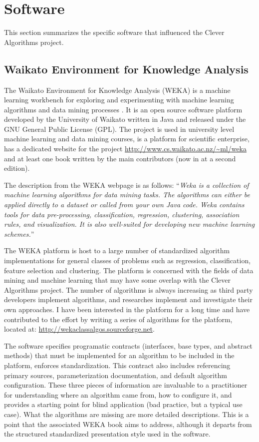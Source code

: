 \documentclass[a4paper, 11pt]{article}
\begin{document}
% 
% 
\section{Software}
\label{sec:software}
This section summarizes the specific software that influenced the Clever Algorithms project.

% 
% 
\subsection{Waikato Environment for Knowledge Analysis}
The Waikato Environment for Knowledge Analysis (WEKA) is a machine learning workbench for exploring and experimenting with machine learning algorithms and data mining processes \cite{Hall2009}. It is an open source software platform developed by the University of Waikato written in Java and released under the GNU General Public License (GPL). The project is used in university level machine learning and data mining courses, is a platform for scientific enterprise, has a dedicated website for the project \url{http://www.cs.waikato.ac.nz/~ml/weka} and at least one book written by the main contributors \cite{Witten2000} (now in at a second edition).

The description from the WEKA webpage is as follows: ``\emph{Weka is a collection of machine learning algorithms for data mining tasks. The algorithms can either be applied directly to a dataset or called from your own Java code. Weka contains tools for data pre-processing, classification, regression, clustering, association rules, and visualization. It is also well-suited for developing new machine learning schemes.}''

The WEKA platform is host to a large number of standardized algorithm implementations for general classes of problems such as regression, classification, feature selection and clustering. The platform is concerned with the fields of data mining and machine learning that may have some overlap with the Clever Algorithms project. The number of algorithms is always increasing as third party developers implement algorithms, and researches implement and investigate their own approaches. I have been interested in the platform for a long time and have contributed to the effort by writing a series of algorithms for the platform, located at: \url{http://wekaclassalgos.sourceforge.net}. 

The software specifies programatic contracts (interfaces, base types, and abstract methods) that must be implemented for an algorithm to be included in the platform, enforces standardization. This contract also includes referencing primary sources, parameterization documentation, and default algorithm configuration. These three pieces of information are invaluable to a practitioner for understanding where an algorithm came from, how to configure it, and provides a starting point for blind application (bad practice, but a typical use case). 
What the algorithms are missing are more detailed descriptions. This is a point that the associated WEKA book aims to address, although it departs from the structured standardized presentation style used in the software.
\end{document}

